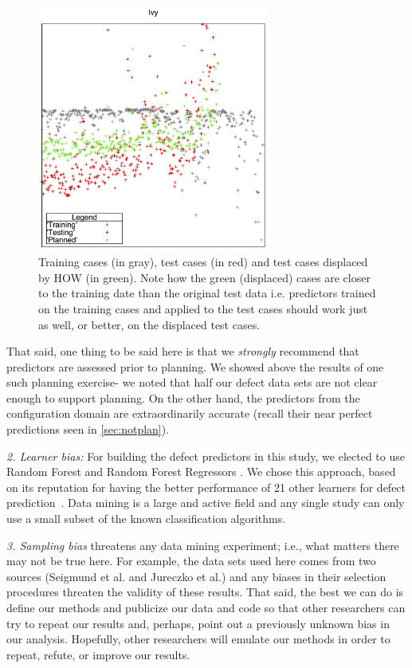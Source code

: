 \documentclass[conference]{IEEEtran}
\newcommand{\tion}[1]{\textsection\ref{sec:#1}}
\begin{document}
\begin{figure}
\begin{center}\includegraphics[width=3in]{figs/2d.png}\end{center}
\caption{Training cases (in gray), test cases (in red) and 
test cases displaced by HOW (in green). Note how the green (displaced) cases are closer to the  training
date than the original test data
i.e. predictors trained on the training cases and
applied to the test cases should
work just as well, or better, on the displaced test cases.}\label{fig:howxy}
\end{figure}

That said, one thing to be said here
is that we {\em strongly} recommend that predictors are assessed prior to planning.
We showed above the results of one such planning exercise- we noted that half
our defect data sets are not clear enough to support planning. On the other hand,
the predictors from the configuration domain are extraordinarily accurate (recall
their near perfect predictions seen in \tion{notplan}).

 
{\em 2. Learner bias: } For building the defect predictors in this study, we elected
to use  Random Forest  and Random Forest Regressors .
We chose this approach,  based on its reputation for having the better  performance of 
21 other learners for defect prediction~\cite{lessmann}.
Data mining is a
large and active field and any single study can only use a small
subset of the known classification algorithms.  


{\em 3. Sampling bias} threatens any data mining experiment; i.e., what matters
there may not be true here. For example, the data sets used here comes from two sources
(Seigmund et al. and Jureczko et al.) and any biases in their selection procedures
threaten the validity of these results. 
That said,
the best we can do is define our methods and publicize our data and code so that other researchers can
try to repeat our results and, perhaps, point out a previously unknown bias
in our analysis. Hopefully, other researchers will emulate our methods in
order to repeat, refute, or improve our results. 
\end{document}
